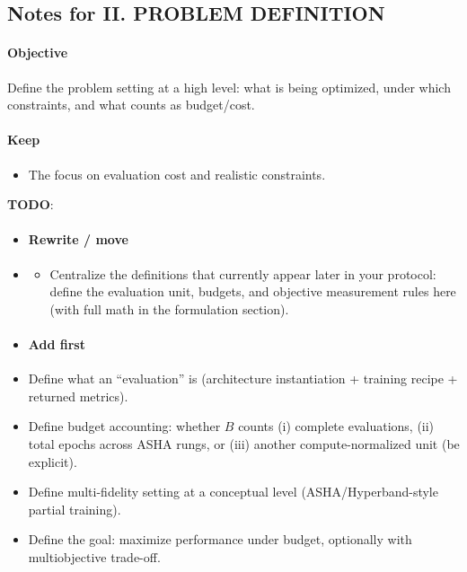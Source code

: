 \subsection*{Notes for II. PROBLEM DEFINITION}
\paragraph{Objective}
Define the problem setting at a high level: what is being optimized, under which constraints, and what counts as budget/cost.

\paragraph{Keep}
\begin{itemize}
  \item The focus on evaluation cost and realistic constraints.
\end{itemize}

\textbf{TODO}:
\begin{itemize}
    \item \paragraph{Rewrite / move}
\end{itemize}
\begin{itemize}
  \item \begin{itemize}
      \item Centralize the definitions that currently appear later in your protocol: define the evaluation unit, budgets, and objective measurement rules here (with full math in the formulation section).
  \end{itemize}
\end{itemize}

\begin{itemize}
    \item \paragraph{Add first}
\end{itemize}
\begin{itemize}
      \begin{itemize}
          \item Define what an “evaluation” is (architecture instantiation + training recipe + returned metrics).
          \end{itemize}
          \begin{itemize}
          \item Define budget accounting: whether $B$ counts (i) complete evaluations, (ii) total epochs across ASHA rungs, or (iii) another compute-normalized unit (be explicit).
          \item Define multi-fidelity setting at a conceptual level (ASHA/Hyperband-style partial training).
          \item Define the goal: maximize performance under budget, optionally with multiobjective trade-off.
      \end{itemize}
  \end{itemize}


